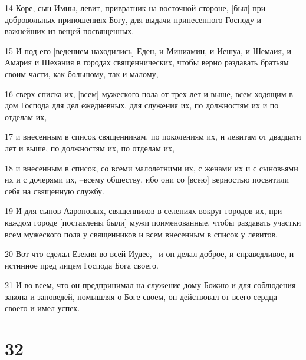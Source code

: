 \par 14 Коре, сын Имны, левит, привратник на восточной стороне, [был] при добровольных приношениях Богу, для выдачи принесенного Господу и важнейших из вещей посвященных.
\par 15 И под его [ведением находились] Еден, и Миниамин, и Иешуа, и Шемаия, и Амария и Шехания в городах священнических, чтобы верно раздавать братьям своим части, как большому, так и малому,
\par 16 сверх списка их, [всем] мужеского пола от трех лет и выше, всем ходящим в дом Господа для дел ежедневных, для служения их, по должностям их и по отделам их,
\par 17 и внесенным в список священникам, по поколениям их, и левитам от двадцати лет и выше, по должностям их, по отделам их,
\par 18 и внесенным в список, со всеми малолетними их, с женами их и с сыновьями их и с дочерями их, --всему обществу, ибо они со [всею] верностью посвятили себя на священную службу.
\par 19 И для сынов Аароновых, священников в селениях вокруг городов их, при каждом городе [поставлены были] мужи поименованные, чтобы раздавать участки всем мужеского пола у священников и всем внесенным в список у левитов.
\par 20 Вот что сделал Езекия во всей Иудее, --и он делал доброе, и справедливое, и истинное пред лицем Господа Бога своего.
\par 21 И во всем, что он предпринимал на служение дому Божию и для соблюдения закона и заповедей, помышляя о Боге своем, он действовал от всего сердца своего и имел успех.

\chapter{32}

